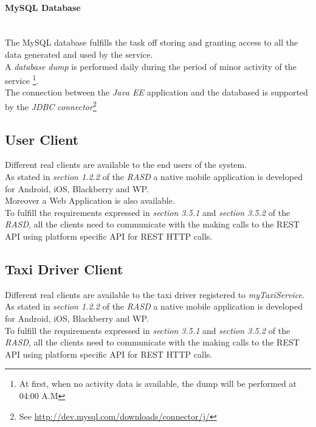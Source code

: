 \paragraph{MySQL Database} %
\label{par:mysql_database}\hfill \\
The MySQL database fulfills the task off storing and granting access to all the data generated and used by the service.\\
A \emph{database dump} is performed daily during the period of minor activity of the service \footnote{At first, when no activity data is available, the dump will be performed at 04:00 A.M}.\\
The connection between the \emph{Java EE} application and the databased is supported by the \emph{JDBC connector}\footnote{See \url{http://dev.mysql.com/downloads/connector/j/}}\\


\subsection{User Client} %
\label{sub:user_client}
Different real clients are available to the end users of the system.\\
As stated in \emph{section 1.2.2} of the \emph{RASD} a native mobile application is developed for Android, iOS, Blackberry and WP.\\
Moreover a Web Application is also available.\\
To fulfill the requirements expressed in \emph{section 3.5.1} and \emph{section 3.5.2} of the \emph{RASD}, all the clients need to communicate with the  making calls to the REST API using platform specific API for REST HTTP calls.


\subsection{Taxi Driver Client} %
\label{sub:taxi_driver_client}
Different real clients are available to the taxi driver registered to \emph{myTaxiService}.\\
As stated in \emph{section 1.2.2} of the \emph{RASD} a native mobile application is developed for Android, iOS, Blackberry and WP.\\
To fulfill the requirements expressed in \emph{section 3.5.1} and \emph{section 3.5.2} of the \emph{RASD}, all the clients need to communicate with the  making calls to the REST API using platform specific API for REST HTTP calls.

